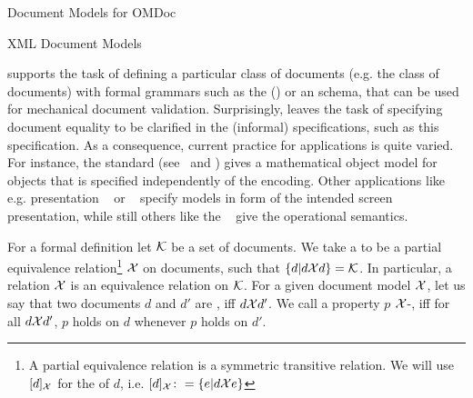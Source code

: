 \begin{tchapter}[id=document-model]{Document Models for OMDoc}
\begin{tsection}[id=xml-DOM]{XML Document Models}

  {\xml} supports the task of defining a particular class of documents (e.g. the class of
  {\omdoc} documents) with formal grammars such as the {} ({}) or an {\xml} schema, that
  can be used for mechanical document validation.  Surprisingly, {\xml} leaves the task of
  specifying document equality to be clarified in the (informal) specifications, such as
  this {\omdoc} specification. As a consequence, current practice for {\xml}
  applications is quite varied. For instance, the {\openmath}
  standard (see~\cite{BusCapCar:2oms04} and {}) gives a mathematical
  object model for {\openmath} objects that is specified independently of the {\xml}
  encoding. Other {\xml} applications like e.g.  presentation
  {\mathml}~\cite{CarIon:MathML03} or {\xhtml}~\cite{W3C:xhtml2000} specify models in form
  of the intended screen presentation, while still others like the
  {\xslt}~\cite{Clark:xslt99} give the operational semantics.

  For a formal definition let ${\cal K}$ be a set of documents. We take a
  {} to be a partial equivalence relation\footnote{A partial
    equivalence relation is a symmetric transitive relation.  We will use $[d]_{\cal X}$ for
    the {} of $d$, i.e.  $[d]_{\cal X}\colon=\{e|d{{\cal X}}e\}$} ${\cal X}$
  on documents, such that $\{d|d{{\cal X}}d\}={\cal K}$. In particular, a relation ${\cal X}$ is an
  equivalence relation on ${\cal K}$.  For a given document model ${\cal X}$, let us say that two
  documents $d$ and $d'$ are {}, iff $d{{\cal X}}d'$. We call a property
  $p$ ${\cal X}$-{}, iff for
  all $d{{\cal X}}d'$, $p$ holds on $d$ whenever $p$ holds on $d'$.


\end{tsection}
\end{tchapter}
